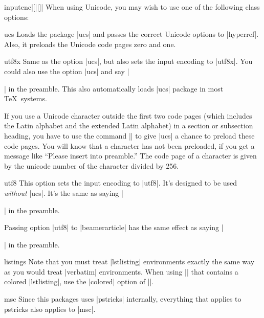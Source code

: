 \begin{package}{{inputenc}|[||]|}
  \beamernote
  When using Unicode, you may wish to use one of the following class options:
  \begin{classoption}{ucs}
    Loads the package |ucs| and passes the correct Unicode options to |hyperref|. Also, it preloads the Unicode code pages zero and one.
  \end{classoption}

  \begin{classoption}{utf8x}
    Same as the option |ucs|, but also sets the input encoding to |utf8x|. You could also use the option |ucs| and say |\usepackage[utf8x]{inputenc}| in the preamble. This also automatically loads |ucs| package in most \TeX\ systems.
  \end{classoption}

  If you use a Unicode character outside the first two code pages (which includes the Latin alphabet and the extended Latin alphabet) in a section or subsection heading, you have to use the command || to give |ucs| a chance to preload these code pages. You will know that a character has not been preloaded, if you get a message like ``Please insert into preamble.'' The code page of a character is given by the unicode number of the character divided by 256.

  \begin{classoption}{utf8}
    This option sets the input encoding to |utf8|. It's designed to be used \emph{without} |ucs|. It's the same as saying |\usepackage[utf8]{inputenc}| in the preamble.
  \end{classoption}

  \articlenote
  Passing option |utf8| to |beamerarticle| has the same effect as saying |\usepackage[utf8]{inputenc}| in the preamble.
\end{package}

\begin{package}{{listings}}
  \beamernote
  Note that you must treat |lstlisting| environments exactly the same way as you would treat |verbatim| environments. When using || that contains a colored |lstlisting|, use the |colored| option of ||.
\end{package}

\begin{package}{{msc}}
  \beamernote
  Since this packages uses |pstricks| internally, everything that applies to pstricks also applies to |msc|.
\end{package}

